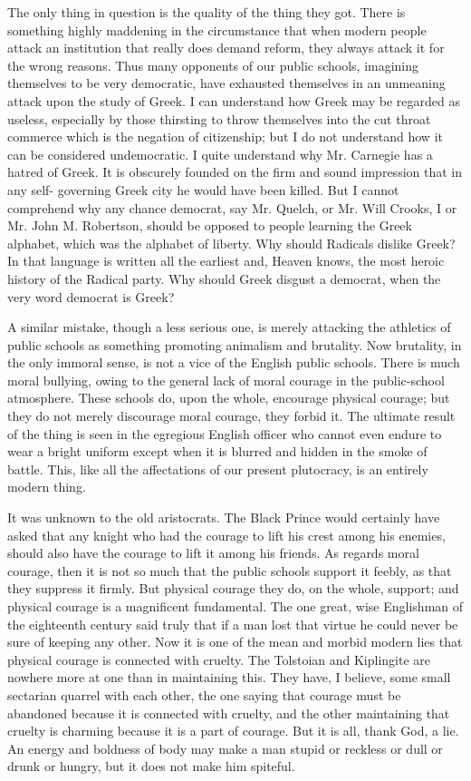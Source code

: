 \documentclass[final,10pt,letterpaper,twocolumn,openany]{book}
\begin{document}
The only thing in question is the quality of the thing they got. There is
something highly maddening in the circumstance that when modern
people attack an institution that really does demand reform, they always
attack it for the wrong reasons. Thus many opponents of our public
schools, imagining themselves to be very democratic, have exhausted
themselves in an unmeaning attack upon the study of Greek. I can
understand how Greek may be regarded as useless, especially by those
thirsting to throw themselves into the cut throat commerce which is the
negation of citizenship; but I do not understand how it can be considered
undemocratic. I quite understand why Mr. Carnegie has a hatred of Greek.
It is obscurely founded on the firm and sound impression that in any self-
governing Greek city he would have been killed. But I cannot comprehend
why any chance democrat, say Mr. Quelch, or Mr. Will Crooks, I or Mr.
John M. Robertson, should be opposed to people learning the Greek
alphabet, which was the alphabet of liberty. Why should Radicals dislike
Greek? In that language is written all the earliest and, Heaven knows, the
most heroic history of the Radical party. Why should Greek disgust a
democrat, when the very word democrat is Greek?

A similar mistake, though a less serious one, is merely attacking the
athletics of public schools as something promoting animalism and
brutality. Now brutality, in the only immoral sense, is not a vice of the
English public schools. There is much moral bullying, owing to the
general lack of moral courage in the public-school atmosphere. These
schools do, upon the whole, encourage physical courage; but they do not
merely discourage moral courage, they forbid it. The ultimate result of the
thing is seen in the egregious English officer who cannot even endure to
wear a bright uniform except when it is blurred and hidden in the smoke of
battle. This, like all the affectations of our present plutocracy, is an entirely
modern thing. 

It was unknown to the old aristocrats. The Black Prince
would certainly have asked that any knight who had the courage to lift his
crest among his enemies, should also have the courage to lift it among his
friends. As regards moral courage, then it is not so much that the public
schools support it feebly, as that they suppress it firmly. But physical
courage they do, on the whole, support; and physical courage is a
magnificent fundamental. The one great, wise Englishman of the
eighteenth century said truly that if a man lost that virtue he could never
be sure of keeping any other. Now it is one of the mean and morbid
modern lies that physical courage is connected with cruelty. The Tolstoian
and Kiplingite are nowhere more at one than in maintaining this. They
have, I believe, some small sectarian quarrel with each other, the one
saying that courage must be abandoned because it is connected with
cruelty, and the other maintaining that cruelty is charming because it is a
part of courage. But it is all, thank God, a lie. An energy and boldness of
body may make a man stupid or reckless or dull or drunk or hungry, but it
does not make him spiteful. 
\end{document}
